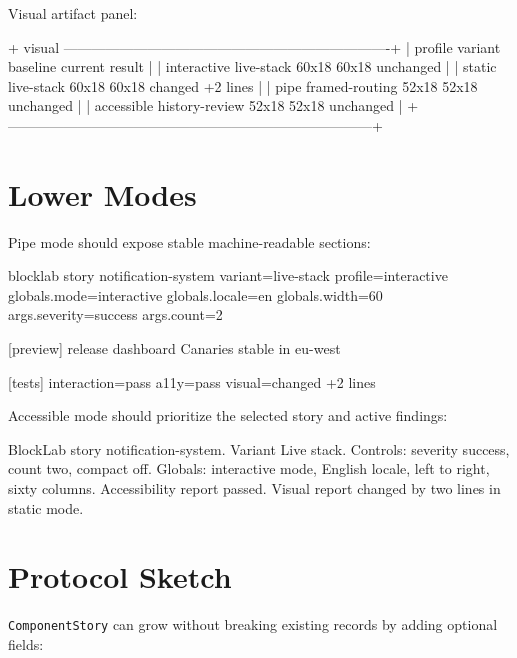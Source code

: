 Visual artifact panel:

\begin{CodeBlock}
+ visual ----------------------------------------------------------------------+
| profile      variant          baseline       current        result            |
| interactive  live-stack       60x18          60x18          unchanged         |
| static       live-stack       60x18          60x18          changed +2 lines  |
| pipe         framed-routing   52x18          52x18          unchanged         |
| accessible   history-review   52x18          52x18          unchanged         |
+------------------------------------------------------------------------------+
\end{CodeBlock}

\section{Lower Modes}\label{record-135-lower-modes}

Pipe mode should expose stable machine-readable sections:

\begin{CodeBlock}
blocklab story notification-system
variant=live-stack
profile=interactive
globals.mode=interactive
globals.locale=en
globals.width=60
args.severity=success
args.count=2

[preview]
release dashboard
Canaries stable in eu-west

[tests]
interaction=pass
a11y=pass
visual=changed +2 lines
\end{CodeBlock}

Accessible mode should prioritize the selected story and active findings:

\begin{CodeBlock}
BlockLab story notification-system. Variant Live stack.
Controls: severity success, count two, compact off.
Globals: interactive mode, English locale, left to right, sixty columns.
Accessibility report passed. Visual report changed by two lines in static mode.
\end{CodeBlock}

\section{Protocol Sketch}\label{record-135-protocol-sketch}

\texttt{C\allowbreak{}o\allowbreak{}m\allowbreak{}p\allowbreak{}o\allowbreak{}n\allowbreak{}e\allowbreak{}n\allowbreak{}t\allowbreak{}S\allowbreak{}t\allowbreak{}o\allowbreak{}r\allowbreak{}y} can grow without breaking existing records by adding optional fields:

